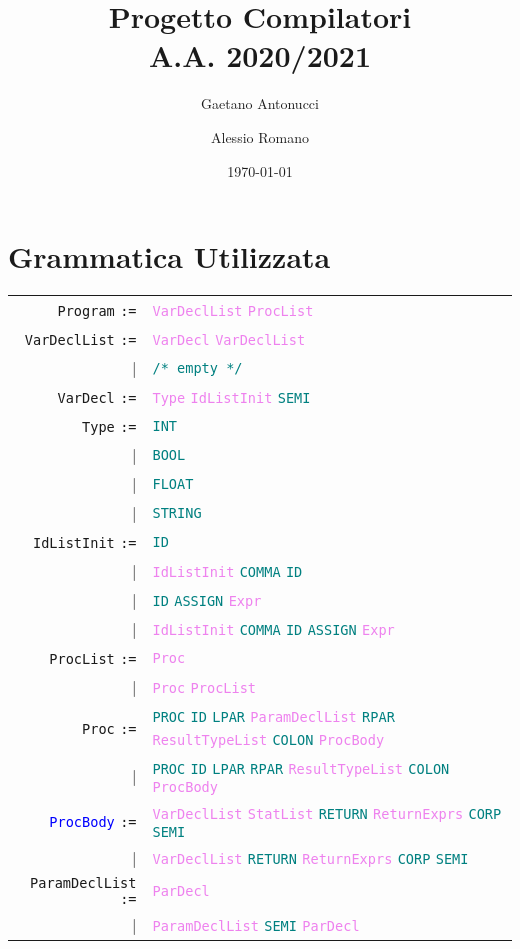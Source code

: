 \documentclass[a4paper,12pt]{article}
\title{Progetto Compilatori \\ \normalsize{A.A. 2020/2021}}
\author{Gaetano Antonucci \and Alessio Romano}
\date{\today}
\newcommand\nonterm[1]{\texttt{\textcolor{violet}{#1}}}
\newcommand\term[1]{\texttt{\textcolor{teal}{#1}}}
\newcommand\production[1]{\texttt{#1} \texttt{:=}}
\newcommand\emptyprod{\texttt{\textcolor{teal}{/* empty */}}}
\begin{document}
    \maketitle
    \tableofcontents
    \newpage
    
    \section{Grammatica Utilizzata}
    \begin{tabular}{rl}
    	\production{Program}     & \nonterm{VarDeclList} \nonterm{ProcList} \\
	\production{VarDeclList} & \nonterm{VarDecl} \nonterm{VarDeclList} \\
	                                     | & \emptyprod \\
	\production{VarDecl}      & \nonterm{Type} \nonterm{IdListInit} \term{SEMI} \\
	\production{Type}           & \term{INT} \\ 
					   | &\term{BOOL} \\ 
					   | &\term{FLOAT} \\
					   | &\term{STRING} \\
	\production{IdListInit}     &\term{ID} \\
					   |&\nonterm{IdListInit} \term{COMMA} \term{ID} \\
					   |&\term{ID} \term{ASSIGN} \nonterm{Expr} \\
					   |&\nonterm{IdListInit} \term{COMMA} \term{ID} \term{ASSIGN} \nonterm{Expr} \\
	\production{ProcList}    &\nonterm{Proc} \\
					  |&\nonterm{Proc} \nonterm{ProcList} \\
	\production{Proc}         & \term{PROC} \term{ID} \term{LPAR} \nonterm{ParamDeclList} \term{RPAR} \nonterm{ResultTypeList} \term{COLON} %
						\nonterm{ProcBody}\\
					  |& \term{PROC} \term{ID} \term{LPAR} \term{RPAR} \nonterm{ResultTypeList} \term{COLON} \nonterm{ProcBody}\\
	\production{\textcolor{blue}{ProcBody}} & \nonterm{VarDeclList} \nonterm{StatList} \term{RETURN} \nonterm{ReturnExprs} \term{CORP} \term{SEMI} \\
	 				  |& \nonterm{VarDeclList} \term{RETURN} \nonterm{ReturnExprs} \term{CORP} \term{SEMI} \\
	\production{ParamDeclList} & \nonterm{ParDecl} \\
						  |& \nonterm{ParamDeclList} \term{SEMI} \nonterm{ParDecl} \\

\end{tabular}
\end{document}
